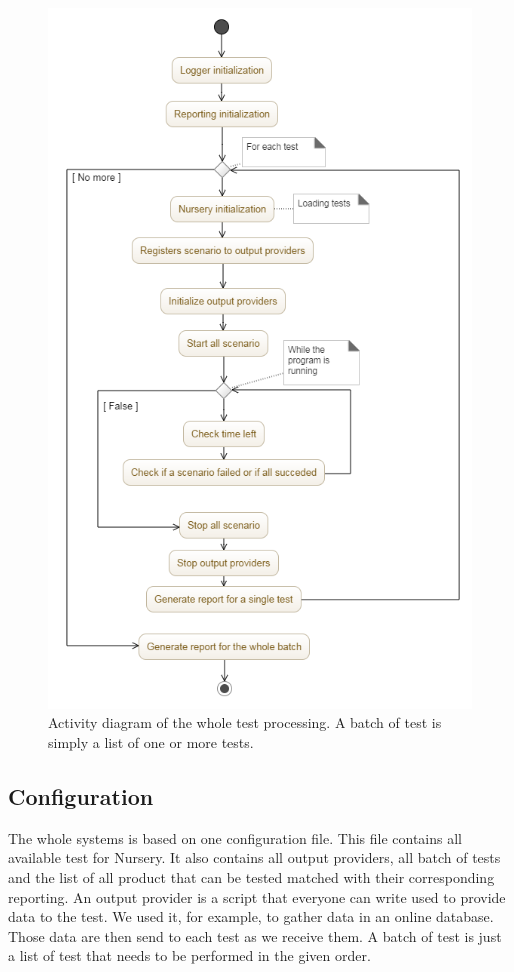 \documentclass[12pt]{article}
\theoremstyle{definition}
\theoremstyle{definition}
\begin{document}
\begin{figure}
    \centering
    \includegraphics[scale=0.5]{activity_diagram.png}
    \caption{Activity diagram of the whole test processing. A batch of test is simply a list of one or more tests.}
    \label{activity_diagram}
\end{figure}

\subsection{Configuration}

The whole systems is based on one configuration file. This file contains all available test for Nursery. It also contains all output providers, all batch of tests and the list of all product that can be tested matched with their corresponding reporting. An output provider is a script that everyone can write used to provide data to the test. We used it, for example, to gather data in an online database. Those data are then send to each test as we receive them. A batch of test is just a list of test that needs to be performed in the given order.\\
\end{document}
